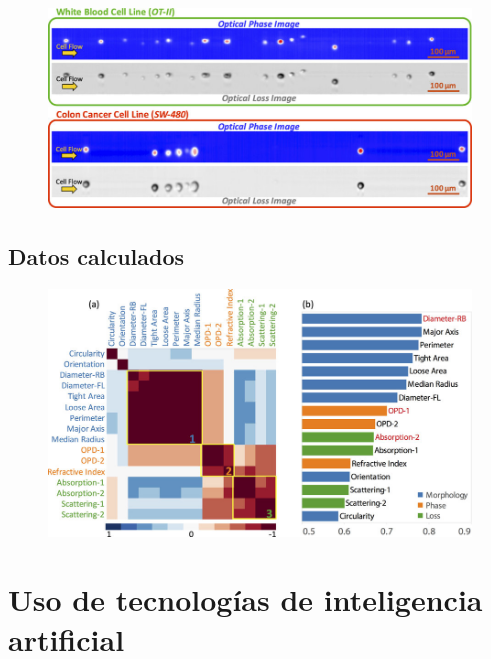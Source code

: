 \documentclass{beamer}
\begin{document}
\begin{frame}
	\begin{figure}
		\centering
		\includegraphics[width=\linewidth]{Phase}
	\end{figure}
\end{frame}

\subsection{Datos calculados}

\begin{frame}
	\begin{figure}
		\centering
		\includegraphics[width=\linewidth]{features}
	\end{figure}
\end{frame}
	
\section{Uso de tecnologías de inteligencia artificial}
	
\end{document}
